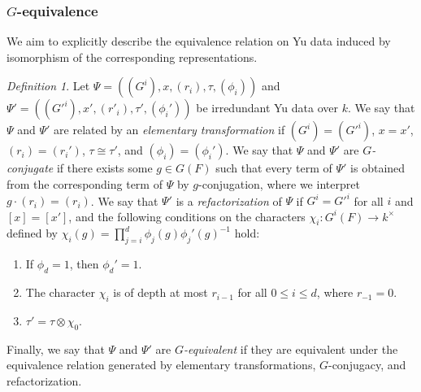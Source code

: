 \documentclass[reqno]{amsart}
\numberwithin{equation}{subsection}
\newcommand{\co}{\colon}
\theoremstyle{remark}
\newtheorem{defn}[thm]{Definition}
\numberwithin{equation}{subsection}
\numberwithin{figure}{subsection}
\begin{document}
\subsubsection{$G$-equivalence}\label{sss:G-equivalence} We aim to explicitly describe the equivalence relation on Yu data induced by isomorphism of the corresponding representations.


\begin{defn}\label{def:G-equivalence}
Let $\Psi = ((G^i), x, (r_i), \tau, (\phi_i))$ and $\Psi' = ((G'^i), x', (r'_i), \tau', (\phi_i'))$ be irredundant Yu data over $k$. We say that $\Psi$ and $\Psi'$ are related by an \textit{elementary transformation} if $(G^i) = (G'^i)$, $x = x'$, $(r_i) = (r_i')$, $\tau \cong \tau'$, and $(\phi_i) = (\phi_i')$. We say that $\Psi$ and $\Psi'$ are \textit{$G$-conjugate} if there exists some $g \in G(F)$ such that every term of $\Psi'$ is obtained from the corresponding term of $\Psi$ by $g$-conjugation, where we interpret $g \cdot (r_i) = (r_i)$. We say that $\Psi'$ is a \textit{refactorization} of $\Psi$ if $G^i = G'^i$ for all $i$ and $[x] = [x']$, and the following conditions on the characters $\chi_i\co G^i(F) \to k^\times$ defined by $\chi_i(g) = \prod_{j=i}^d \phi_j(g)\phi_j'(g)^{-1}$ hold:
\begin{enumerate}
\item If $\phi_d = 1$, then $\phi_d' = 1$.
\item The character $\chi_i$ is of depth at most $r_{i-1}$ for all $0 \leq i \leq d$, where $r_{-1} = 0$.
\item $\tau' = \tau \otimes \chi_0$.
\end{enumerate}
Finally, we say that $\Psi$ and $\Psi'$ are \textit{$G$-equivalent} if they are equivalent under the equivalence relation generated by elementary transformations, $G$-conjugacy, and refactorization. 

\end{defn}
\end{document}
